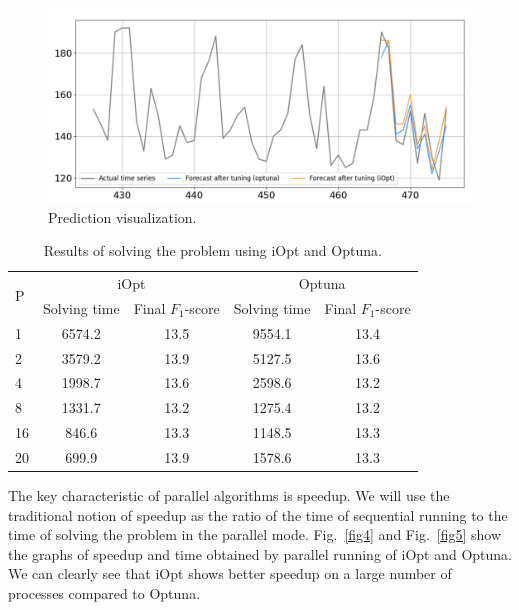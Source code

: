 \documentclass[runningheads]{llncs}
\begin{document}
%
%
%
%
%
%

\begin{figure}
\center
\includegraphics[width=1\textwidth]{fig3.png}
\caption{Prediction visualization.} \label{fig3}
\end{figure}
%
%
%
%
%
%
\begin{table}
\centering
\caption{Results of solving the problem using iOpt and Optuna.}\label{tab1}
\begin{tabular}{|l|c|c|c|c|}
\hline
\multirow{2}{*}{P} & \multicolumn{2}{c|}{iOpt} & \multicolumn{2}{c|}{Optuna} \\
\cline{2-5} 
 & Solving time & Final $F_1$-score & Solving time & Final $F_1$-score \\
\hline
1 & 6574.2 & 13.5 & 9554.1 & 13.4 \\
2 & 3579.2 & 13.9 & 5127.5 & 13.6 \\
4 & 1998.7 & 13.6 & 2598.6 & 13.2 \\
8 & 1331.7 & 13.2 & 1275.4 & 13.2 \\
16 & 846.6 & 13.3 & 1148.5 & 13.3 \\
20 & 699.9 & 13.9 & 1578.6 & 13.3 \\
\hline
\end{tabular}
\end{table}

The key characteristic of parallel algorithms is speedup. We will use the traditional notion of speedup as the ratio of the time of sequential running to the time of solving the problem in the parallel mode. Fig.~\ref{fig4} and Fig.~\ref{fig5} show the graphs of speedup and time obtained by parallel running of iOpt and Optuna. We can clearly see that iOpt shows better speedup on a large number of processes compared to Optuna.
\end{document}
